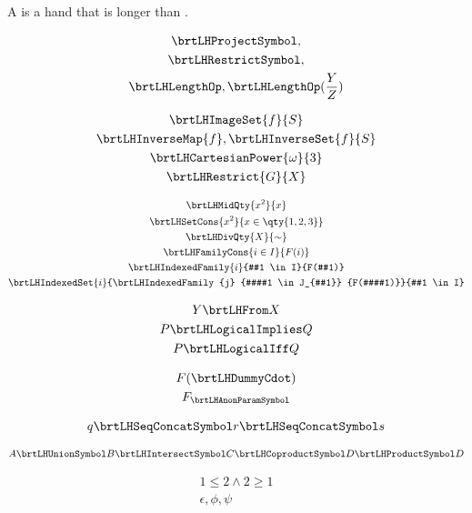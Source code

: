 \documentclass{article}
\begin{document}
    A  is a hand that is longer than
    .

    \begin{gather}
        \brtLHProjectSymbol ,
        \\
        \brtLHRestrictSymbol ,
        \\
        \brtLHLengthOp ,
        \brtLHLengthOp(\frac Y Z)
    \end{gather}

    \begin{gather}
        \brtLHImageSet {f} {S}
        \\
        \brtLHInverseMap {f} ,
        \brtLHInverseSet {f} {S}
        \\
        \brtLHCartesianPower {\omega} {3}
        \\
        \brtLHRestrict {G} {X}
    \end{gather}

    \begin{gather}
        \brtLHMidQty {x^2} {x}
        \\
        \brtLHSetCons {x^2} {x \in \qty{1,2,3}}
        \\
        \brtLHDivQty {X} {\sim}
        \\
        \brtLHFamilyCons {i \in I} {F(i)}
        \\
        \brtLHIndexedFamily {i} {#1 \in I} {F(#1)}
        \\
        \brtLHIndexedSet {i}
            {\brtLHIndexedFamily {j} {##1 \in J_{#1}} {F(##1)}}
            {#1 \in I}
    \end{gather}

    \begin{gather}
        Y \brtLHFrom X
        \\
        P \brtLHLogicalImplies Q
        \\
        P \brtLHLogicalIff Q
    \end{gather}

    \begin{gather}
        F(\brtLHDummyCdot)
        \\
        F_{\brtLHAnonParamSymbol}
    \end{gather}

    \begin{gather}
        q
        \brtLHSeqConcatSymbol
        r
        \brtLHSeqConcatSymbol
        s
    \end{gather}

    \begin{gather}
        A
        \brtLHUnionSymbol B
        \brtLHIntersectSymbol C
        \brtLHCoproductSymbol D
        \brtLHProductSymbol D
    \end{gather}

    \begin{gather}
        1 \leq 2 \land
        2 \geq 1
        \\
        \epsilon
        , \phi
        , \psi
    \end{gather}
\end{document}
